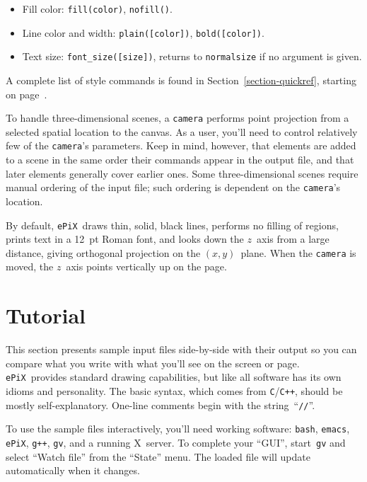 \documentclass[12pt,letterpaper]{book}
\newcommand{\code}[1]{\texttt{#1}}
\newcommand{\filename}[1]{\texttt{#1}}
\newcommand{\ePiX}{\code{ePiX}}
\newcommand{\CXX}{\code{C++}}
\newcommand{\teximath}[1]{$#1$}
\begin{document}
\begin{itemize}

\item Fill color: \code{fill(color)}, \code{nofill()}.

\item Line color and width: \code{plain([color])},
  \code{bold([color])}.

\item Text size: \code{font\_size([size])}, returns to
  \code{normalsize} if no argument is given.

\end{itemize}

\noindent A complete list of style commands is found in
Section~\ref{section-quickref}, starting on
page~\pageref{section-quickref}.

To handle three-dimensional scenes, a \code{camera} performs point
projection from a selected spatial location to the canvas. As a user,
you'll need to control relatively few of the \code{camera}'s
parameters. Keep in mind, however, that elements are added to a scene
in the same order their commands appear in the output file, and that
later elements generally cover earlier ones. Some three-dimensional
scenes require manual ordering of the input file; such ordering is
dependent on the \code{camera}'s location.

By default, \ePiX\ draws thin, solid, black lines, performs no filling
of regions, prints text in a 12~pt Roman font, and looks down the
\teximath{z}~axis from a large distance, giving orthogonal projection
on the \teximath{(x,y)}~plane. When the \code{camera} is moved, the
\teximath{z}~axis points vertically up on the page.


\section{Tutorial}
\label{section-tutorial}

This section presents sample input files side-by-side with their
output so you can compare what you write with what you'll see on the
screen or page.  \ePiX\ provides standard drawing capabilities, but
like all software has its own idioms and personality. The basic
syntax, which comes from \code{C}/\CXX, should be mostly
self-explanatory. One-line comments begin with the
string~``\verb+//+''.


To use the sample files interactively, you'll need working software:
\filename{bash}, \filename{emacs}, \ePiX, \filename{g++},
\filename{gv}, and a running X~server. To complete your ``GUI'',
start~\filename{gv} and select ``Watch file'' from the ``State''
menu. The loaded file will update automatically when it changes.
\end{document}
